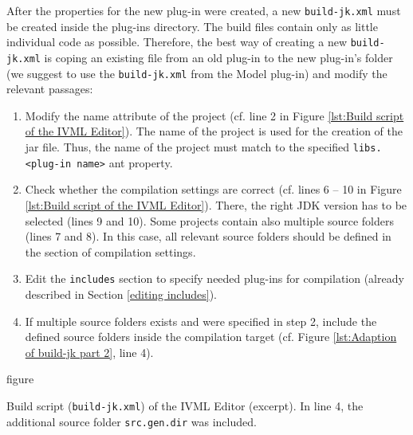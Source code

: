 After the properties for the new plug-in were created, a new \texttt{build-jk.xml} must be created inside the plug-ins directory. The build files contain only as little individual code as possible. Therefore, the best way of creating a new \texttt{build-jk.xml} is coping an existing file from an old plug-in to the new plug-in's folder (we suggest to use the \texttt{build-jk.xml} from the Model plug-in) and modify the relevant passages:
\begin{enumerate}
	\item Modify the name attribute of the project (cf. line 2 in Figure \vref{lst:Build script of the IVML Editor}). The name of the project is used for the creation of the jar file. Thus, the name of the project must match to the specified \texttt{libs.<plug-in name>} ant property.
	\item Check whether the compilation settings are correct (cf. lines 6 -- 10 in Figure \vref{lst:Build script of the IVML Editor}). There, the right JDK version has to be selected (lines 9 and 10). Some projects contain also multiple source folders (lines 7 and 8). In this case, all relevant source folders should be defined in the section of compilation settings.
	\item Edit the \texttt{includes} section to specify needed plug-ins for compilation (already described in Section \vref{editing includes}).
	\item If multiple source folders exists and were specified in step 2, include the defined source folders inside the compilation target (cf. Figure \vref{lst:Adaption of build-jk part 2}, line 4).
\end{enumerate}

\begin{nofloat}{figure}
	\centering
	
	\caption[Build script of the IVML Editor (compilation target)]{Build script (\texttt{build-jk.xml}) of the IVML Editor (excerpt). In line 4, the additional source folder \texttt{src.gen.dir} was included.}
	\label{lst:Adaption of build-jk part 2}
\end{nofloat}

